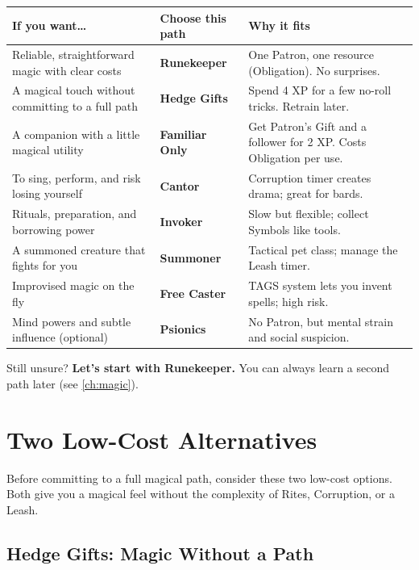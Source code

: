 \begin{center}
\small
\renewcommand{\arraystretch}{1.3}
\begin{tabularx}{\textwidth}{l X X}
\toprule
\textbf{If you want\dots} & \textbf{Choose this path} & \textbf{Why it fits} \\
\midrule
Reliable, straightforward magic with clear costs & \textbf{Runekeeper} & One Patron, one resource (Obligation). No surprises. \\
A magical touch without committing to a full path & \textbf{Hedge Gifts} & Spend 4 XP for a few no-roll tricks. Retrain later. \\
A companion with a little magical utility & \textbf{Familiar Only} & Get Patron's Gift and a follower for 2 XP. Costs Obligation per use. \\
To sing, perform, and risk losing yourself & \textbf{Cantor} & Corruption timer creates drama; great for bards. \\
Rituals, preparation, and borrowing power & \textbf{Invoker} & Slow but flexible; collect Symbols like tools. \\
A summoned creature that fights for you & \textbf{Summoner} & Tactical pet class; manage the Leash timer. \\
Improvised magic on the fly & \textbf{Free Caster} & TAGS system lets you invent spells; high risk. \\
Mind powers and subtle influence (optional) & \textbf{Psionics} & No Patron, but mental strain and social suspicion. \\
\bottomrule
\end{tabularx}
\end{center}

\noindent
Still unsure? \textbf{Let's start with Runekeeper.} You can always learn a second path later (see \ref{ch:magic}).

\section{Two Low-Cost Alternatives}

Before committing to a full magical path, consider these two low-cost options. Both give you a magical feel without the complexity of Rites, Corruption, or a Leash.

\subsection{Hedge Gifts: Magic Without a Path}

